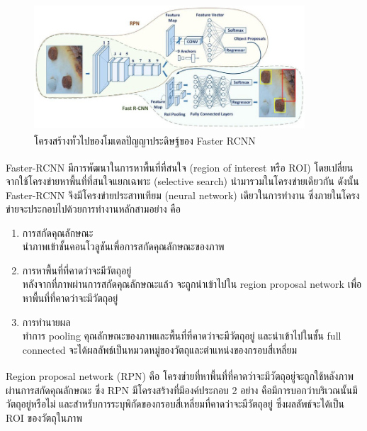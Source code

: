 \begin{figure}[!ht]
    \centering
    \includegraphics[width=0.9\textwidth]{chapter2/images/faster_rcnn.png}
    \caption[โครงสร้างทั่วไปของโมเดลปัญญาประดิษฐ์ของ Faster RCNN]{โครงสร้างทั่วไปของโมเดลปัญญาประดิษฐ์ของ Faster RCNN\textsuperscript{\cite{faster_pic}}}
    \label{fig:faster_rcnn_architecture}
\end{figure}
\par Faster-RCNN\textsuperscript{\cite{faster}} มีการพัฒนาในการหาพื้นที่ที่สนใจ (region of interest หรือ ROI) โดยเปลี่ยนจากใช้โครงข่ายหาพื้นที่ที่สนใจแยกเฉพาะ (selective search) นำมารวมในโครงข่ายเดียวกัน 
ดังนั้น Faster-RCNN จึงมีโครงข่ายประสาทเทียม (neural network) เดียวในการทำงาน ซึ่งภายในโครงข่ายจะประกอบไปด้วยการทำงานหลักสามอย่าง คือ
\begin{enumerate}
	\setlength\itemsep{-0.25em}
	\item การสกัดคุณลักษณะ
	\\	นำภาพเข้าชั้นคอนโวลูชันเพื่อการสกัดคุณลักษณะของภาพ
	\item การหาพื้นที่ที่คาดว่าจะมีวัตถุอยู่
	\\	หลังจากที่ภาพผ่านการสกัดคุณลักษณะแล้ว จะถูกนำเข้าไปใน region proposal network เพื่อหาพื้นที่ที่คาดว่าจะมีวัตถุอยู่
	\item การทำนายผล
	\\	ทำการ pooling คุณลักษณะของภาพและพื้นที่ที่คาดว่าจะมีวัตถุอยู่ และนำเข้าไปในชั้น full connected จะได้ผลลัพธ์เป็นหมวดหมู่ของวัตถุและตำแหน่งของกรอบสี่เหลี่ยม  
\end{enumerate}
\par Region proposal network (RPN)\textsuperscript{\cite{faster}} คือ โครงข่ายที่หาพื้นที่ที่คาดว่าจะมีวัตถุอยู่จะถูกใช้หลังภาพผ่านการสกัดคุณลักษณะ ซึ่ง RPN มีโครงสร้างที่มีองค์ประกอบ 2 อย่าง
คือมีการบอกว่าบริเวณนั้นมีวัตถุอยู่หรือไม่ และสำหรับการระบุพิกัดของกรอบสี่เหลี่ยมที่คาดว่าจะมีวัตถุอยู่ ซึ่งผลลัพธ์จะได้เป็น ROI ของวัตถุในภาพ 